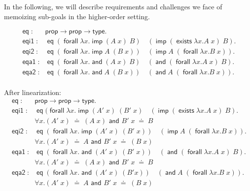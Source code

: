 \documentclass{acmconf}
\newcommand{\typeLF}{\textsf{type}}
\newcommand{\propLF}{\textsf{prop}}
\newcommand{\andLF}{\; \textsf{and}\;}
\newcommand{\impLF}{\;\textsf{imp}\;}
\newcommand{\forallLF}{\;\textsf{forall}\;}
\newcommand{\existsLF}{\;\textsf{exists}\;}
\newcommand{\eqLF}{\;\textsf{eq}\;}
\newcommand{\eqilLF}{\;\textsf{eqi1}\;}
\newcommand{\eqirLF}{\;\textsf{eqi2}\;}
\newcommand{\eqalLF}{\;\textsf{eqa1}\;}
\newcommand{\eqarLF}{\;\textsf{eqa2}\;}
\newcommand{\unif}{\;\doteq\;}
\begin{document}
 In the following, we will describe requirements and
challenges we face of memoizing sub-goals in the higher-order setting. 


\[
\begin{array}{ll}
\eqLF: & \propLF \rightarrow \propLF \rightarrow \typeLF.\\[1em]
%
\eqilLF: & \eqLF (\forallLF \lambda x. \impLF (A\; x)\; B)\quad (\impLF (\existsLF \lambda x. A\; x)\; B).\\
\eqirLF: & \eqLF (\forallLF \lambda x. \impLF A \; (B\; x)) \quad (\impLF A\; (\forallLF \lambda x. B\;x)).\\
\eqalLF: & \eqLF (\forallLF \lambda x. \andLF (A\; x)\; B) \quad (\andLF (\forallLF \lambda x. A \;x) \; B).\\
\eqarLF: & \eqLF (\forallLF \lambda x. \andLF A \; (B\;x)) \quad (\andLF A \; (\forallLF \lambda x. B\; x)).\\
\end{array}
\]

After linearization:
\[
\begin{array}{ll}
\eqLF: & \propLF \rightarrow \propLF \rightarrow \typeLF.\\[1em]
%
\eqilLF: & \eqLF (\forallLF \lambda x. \impLF (A'\; x)\; (B'\;x)\quad (\impLF (\existsLF \lambda x. A\; x)\; B). \\
         & \forall x. (A'\; x) \unif (A \; x) {\textsf{ and } } B'\;x   \unif B\\[0.5em]
\eqirLF: & \eqLF (\forallLF \lambda x. \impLF (A'\;x) \; (B'\; x)) \quad (\impLF A\; (\forallLF \lambda x. B\;x)).\\
         & \forall x. (A'\; x) \unif A  {\textsf{ and }} B'\;x   \unif (B\;x)\\[0.5em]
\eqalLF: & \eqLF (\forallLF \lambda x. \andLF (A'\; x) \; (B'\;x)) \quad (\andLF (\forallLF \lambda x. A \;x) \; B).\\
         & \forall x. (A'\; x) \unif (A \; x) {\textsf{ and }} B'\;x   \unif B\\[0.5em]
\eqarLF: & \eqLF (\forallLF \lambda x. \andLF (A'\;x) \; (B' x)) \quad (\andLF A \; (\forallLF \lambda x. B\; x)).\\
         & \forall x. (A'\; x) \unif A  {\textsf{ and }} B'\;x   \unif (B\;x)\\[0.5em]
\end{array}
\]


%
\end{document}
